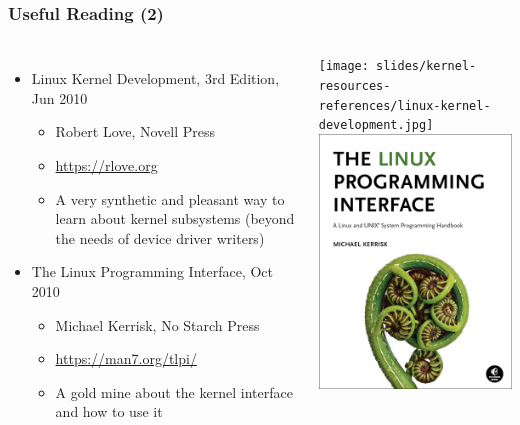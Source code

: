 \begin{frame}
  \frametitle{Useful Reading (2)}
  \begin{columns}
    \begin{itemize}
    \item Linux Kernel Development, 3rd Edition, Jun 2010
      \begin{itemize}
      \item Robert Love, Novell Press
      \item \url{https://rlove.org}
      \item A very synthetic and pleasant way to learn about kernel
        subsystems (beyond the needs of device driver writers)
      \end{itemize}
    \item The Linux Programming Interface, Oct 2010
      \begin{itemize}
      \item Michael Kerrisk, No Starch Press
      \item \url{https://man7.org/tlpi/}
      \item A gold mine about the kernel interface and how to use it
      \end{itemize}
    \end{itemize}
    \begin{center}
      \texttt{[image: slides/kernel-resources-references/linux-kernel-development.jpg]}\\
      \includegraphics[height=0.4\textheight]{common/linux-programming-interface.png}
    \end{center}
  \end{columns}
\end{frame}

